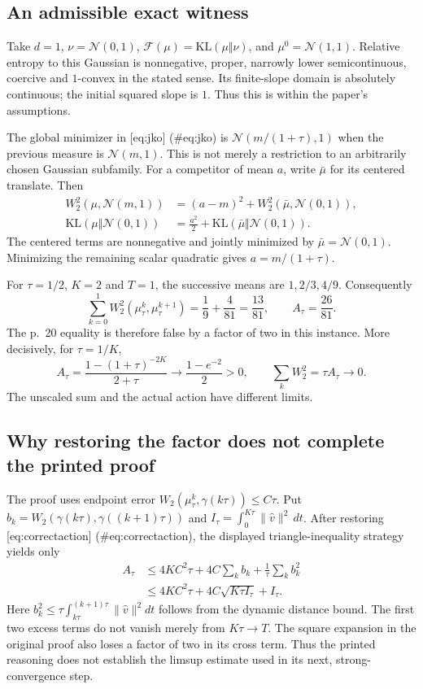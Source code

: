 \documentclass[10pt]{article}
\begin{document}
\subsection*{An admissible exact witness}
Take \(d=1\), \(\nu=\mathcal N(0,1)\), \(\mathcal F(\mu)=\mathrm{KL}(\mu\Vert\nu)\), and \(\mu^0=\mathcal N(1,1)\). Relative entropy to this Gaussian is nonnegative, proper, narrowly lower semicontinuous, coercive and \(1\)-convex in the stated sense. Its finite-slope domain is absolutely continuous; the initial squared slope is \(1\). Thus this is within the paper’s assumptions.\par
The global minimizer in [eq:jko] (\#eq:jko) is \(\mathcal N(m/(1+\tau),1)\) when the previous measure is \(\mathcal N(m,1)\). This is not merely a restriction to an arbitrarily chosen Gaussian subfamily. For a competitor of mean \(a\), write \(\bar\mu\) for its centered translate. Then \[\begin{aligned}
 W_2^2(\mu,\mathcal N(m,1))
  &=(a-m)^2+W_2^2(\bar\mu,\mathcal N(0,1)),\\
 \mathrm{KL}(\mu\Vert\mathcal N(0,1))
  &=\frac{a^2}{2}+\mathrm{KL}(\bar\mu\Vert\mathcal N(0,1)).\end{aligned}\] The centered terms are nonnegative and jointly minimized by \(\bar\mu=\mathcal N(0,1)\). Minimizing the remaining scalar quadratic gives \(a=m/(1+\tau)\).\par
For \(\tau=1/2\), \(K=2\) and \(T=1\), the successive means are \(1,2/3,4/9\). Consequently \[\sum_{k=0}^1W_2^2(\mu_\tau^k,\mu_\tau^{k+1})
 =\frac19+\frac4{81}=\frac{13}{81},
 \qquad A_\tau=\frac{26}{81}.\] The p. 20 equality is therefore false by a factor of two in this instance. More decisively, for \(\tau=1/K\), \[A_\tau=\frac{1-(1+\tau)^{-2K}}{2+\tau}
 \longrightarrow \frac{1-e^{-2}}2>0,
 \qquad \sum_k W_2^2=\tau A_\tau\longrightarrow0.\] The unscaled sum and the actual action have different limits.\par
\subsection*{Why restoring the factor does not complete the printed proof}
The proof uses endpoint error \(W_2(\mu_\tau^k,\gamma(k\tau))\le C\tau\). Put \(b_k=W_2(\gamma(k\tau),\gamma((k+1)\tau))\) and \(I_\tau=\int_0^{K\tau}\|\widehat v\|^2\,dt\). After restoring [eq:correctaction] (\#eq:correctaction), the displayed triangle-inequality strategy yields only \[\begin{aligned}
 A_\tau
 &\le 4KC^2\tau+4C\sum_k b_k+\frac1\tau\sum_k b_k^2\\
 &\le 4KC^2\tau+4C\sqrt{K\tau I_\tau}+I_\tau.\end{aligned}\] Here \(b_k^2\le\tau\int_{k\tau}^{(k+1)\tau}\|\widehat v\|^2dt\) follows from the dynamic distance bound. The first two excess terms do not vanish merely from \(K\tau\to T\). The square expansion in the original proof also loses a factor of two in its cross term. Thus the printed reasoning does not establish the limsup estimate used in its next, strong-convergence step.\par
\end{document}
